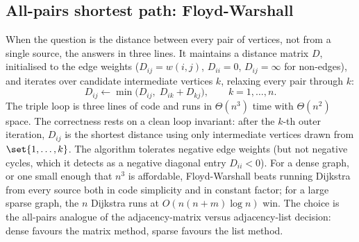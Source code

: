 \subsection{All-pairs shortest path: Floyd-Warshall}

When the question is the distance between every pair of vertices,
not from a single source, the 
answers in three lines. It maintains a distance matrix $D$,
initialised to the edge weights ($D_{ij} = w(i, j)$, $D_{ii} = 0$,
$D_{ij} = \infty$ for non-edges), and iterates over candidate
intermediate vertices $k$, relaxing every pair through $k$:
\[
D_{ij} \leftarrow \min\big(D_{ij},\; D_{ik} + D_{kj}\big),
\qquad k = 1, \ldots, n.
\]
The triple loop is three lines of code and runs in $\Theta(n^{3})$
time with $\Theta(n^{2})$ space. The correctness rests on a clean
loop invariant: after the $k$-th outer iteration, $D_{ij}$ is the
shortest distance using only intermediate vertices drawn from
$\set{1, \ldots, k}$. The algorithm tolerates negative edge weights
(but not negative cycles, which it detects as a negative diagonal
entry $D_{ii} < 0$). For a dense graph, or one small enough that
$n^{3}$ is affordable, Floyd-Warshall beats running Dijkstra from
every source both in code simplicity and in constant factor; for a
large sparse graph, the $n$ Dijkstra runs at $O(n(n+m)\log n)$ win.
The choice is the all-pairs analogue of the adjacency-matrix versus
adjacency-list decision: dense favours the matrix method, sparse
favours the list method.

